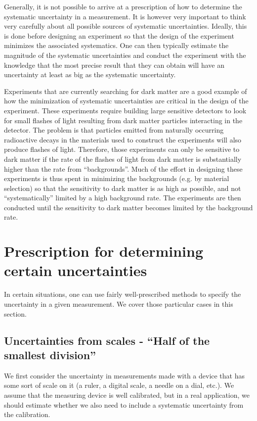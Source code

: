 Generally, it is not possible to arrive at a prescription of how to determine the systematic uncertainty in a measurement. It is however very important to think very carefully about all possible sources of systematic uncertainties. Ideally, this is done before designing an experiment so that the design of the experiment minimizes the associated systematics. One can then typically estimate the magnitude of the systematic uncertainties and conduct the experiment with the knowledge that the most precise result that they can obtain will have an uncertainty at least as big as the systematic uncertainty.

Experiments that are currently searching for dark matter are a good example of how the minimization of systematic uncertainties are critical in the design of the experiment. These experiments require building large sensitive detectors to look for small flashes of light resulting from dark matter particles interacting in the detector. The problem is that particles emitted from naturally occurring radioactive decays in the materials used to construct the experiments will also produce flashes of light. Therefore, those experiments can only be sensitive to dark matter if the rate of the flashes of light from dark matter is substantially higher than the rate from ``backgrounds''. Much of the effort in designing these experiments is thus spent in minimizing the backgrounds (e.g. by material selection) so that the sensitivity to dark matter is as high as possible, and not ``systematically'' limited by a high background rate. The experiments are then conducted until the sensitivity to dark matter becomes limited by the background rate.

\section{Prescription for determining certain uncertainties}
In certain situations, one can use fairly well-prescribed methods to specify the uncertainty in a given measurement. We cover those particular cases in this section.

\subsection{Uncertainties from scales - ``Half of the smallest division''}
We first consider the uncertainty in measurements made with a device that has some sort of scale on it (a ruler, a digital scale, a needle on a dial, etc.). We assume that the measuring device is well calibrated, but in a real application, we should estimate whether we also need to include a systematic uncertainty from the calibration. 

